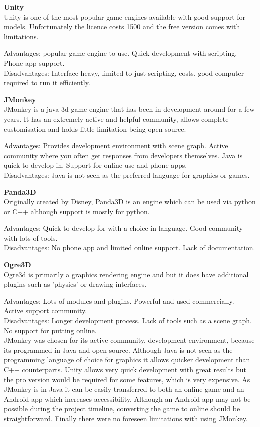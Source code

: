 \documentclass[11pt]{report}
\begin{document}
\textbf{Unity}\\
Unity is one of the most popular game engines available with good support for models. Unfortunately the licence costs 1500 and the free version comes with limitations.

Advantages: popular game engine to use. Quick development with scripting. Phone app support.\\
Disadvantages: Interface heavy, limited to just scripting, costs, good computer required to run it efficiently.

\textbf{JMonkey}\\
JMonkey is a java 3d game engine that has been in development around for a few years. It has an extremely active and helpful community, allows complete customisation and holds little limitation being open source.

Advantages: Provides development environment with scene graph. Active community where you often get responses from developers themselves. Java is quick to develop in. Support for online use and phone apps. \\
Disadvantages: Java is not seen as the preferred language for graphics or games.

\textbf{Panda3D}\\
Originally created by Disney, Panda3D is an engine which can be used via python or C++ although support is mostly for python.

Advantages: Quick to develop for with a choice in language. Good community with lots of tools.\\
Disadvantages: No phone app and limited online support. Lack of documentation. 

\textbf{Ogre3D}\\
Ogre3d is primarily a graphics rendering engine and but it does have additional plugins such as 'physics' or drawing interfaces.

Advantages: Lots of modules and plugins. Powerful and used commercially. Active support community.\\
Disadvantages: Longer development process. Lack of tools such as a scene graph. No support for putting online.\\

JMonkey was chosen for its active community, development environment, because its programmed in Java and open-source. Although Java is not seen as the programming language of choice for graphics it allows quicker development than C++ counterparts. Unity allows very quick development with great results but the pro version would be required for some features, which is very expensive. As JMonkey is in Java it can be easily transferred to both an online game and an Android app which increases accessibility. Although an Android app may not be possible during the project timeline, converting the game to online should be straightforward. Finally there were no foreseen limitations with using JMonkey.
\end{document}
